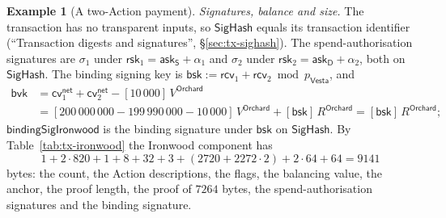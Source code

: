 \documentclass[11pt,a4paper]{article}
\theoremstyle{definition}
\newtheorem{example}[theorem]{Example}
\newcommand{\cvsym}{\mathsf{cv}}
\newcommand{\Vesta}{\ensuremath{\mathsf{Vesta}}}
\newcommand{\ask}{\ensuremath{\mathsf{ask}}}
\newcommand{\rcv}{\ensuremath{\mathsf{rcv}}}
\newcommand{\rsk}{\ensuremath{\mathsf{rsk}}}
\begin{document}
\begin{example}[A two-Action payment]
\emph{Signatures, balance and size.} The transaction has no transparent
inputs, so $\mathsf{SigHash}$ equals its transaction identifier
(``Transaction digests and signatures'', \S\ref{sec:tx-sighash}). The
spend-authorisation signatures are $\sigma_1$ under
$\rsk_1 = \ask_{\mathsf{S}} + \alpha_1$ and $\sigma_2$ under
$\rsk_2 = \ask_{\mathsf{D}} + \alpha_2$, both on $\mathsf{SigHash}$. The
binding signing key is $\mathsf{bsk} := \rcv_1 + \rcv_2 \bmod p_{\Vesta}$,
and
\begin{align*}
  \mathsf{bvk} &= \cvsym^{\mathsf{net}}_1 + \cvsym^{\mathsf{net}}_2
    - [10\,000]\,V^{\mathsf{Orchard}} \\
  &= [200\,000\,000 - 199\,990\,000 - 10\,000]\,V^{\mathsf{Orchard}}
    + [\mathsf{bsk}]\,R^{\mathsf{Orchard}}
   = [\mathsf{bsk}]\,R^{\mathsf{Orchard}};
\end{align*}
$\mathsf{bindingSigIronwood}$ is the binding signature under $\mathsf{bsk}$
on $\mathsf{SigHash}$. By Table~\ref{tab:tx-ironwood} the Ironwood
component has
\[
  1 + 2 \cdot 820 + 1 + 8 + 32 + 3 + (2720 + 2272 \cdot 2) + 2 \cdot 64
    + 64 = 9141
\]
bytes: the count, the Action descriptions, the flags, the balancing value,
the anchor, the proof length, the proof of $7264$ bytes, the
spend-authorisation signatures and the binding signature.


\end{example}
\end{document}
